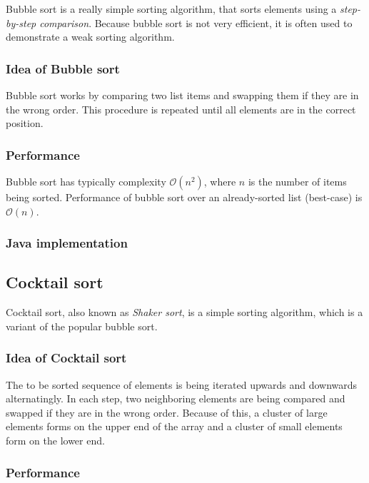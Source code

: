 \documentclass[]{pfBook}
\newcommand{\OO}{\mathcal{O}}
\begin{document}
	Bubble sort is a really simple sorting algorithm, that sorts elements using a \emph{step-by-step comparison}. Because bubble sort is not very efficient, it is often used to demonstrate a weak sorting algorithm.
	
	\subsubsection{Idea of Bubble sort}
	
	Bubble sort works by comparing two list items and swapping them if they are in the wrong order. This procedure is repeated until all elements are in the correct position.
	
	\subsubsection{Performance}
	
	Bubble sort has typically complexity $\OO(n^2)$, where $n$ is the number of items being sorted. Performance of bubble sort over an already-sorted list (best-case) is $\OO(n)$.
	
	\subsubsection{Java implementation}
	
	
	
	\subsection{Cocktail sort}
	
	Cocktail sort, also known as \emph{Shaker sort}, is a simple sorting algorithm, which is a variant of the popular bubble sort.
	
	\subsubsection{Idea of Cocktail sort}
	
	The to be sorted sequence of elements is being iterated upwards and downwards alternatingly. In each step, two neighboring elements are being compared and swapped if they are in the wrong order. Because of this, a cluster of large elements forms on the upper end of the array and a cluster of small elements form on the lower end.
	
	\subsubsection{Performance}
	
\end{document}
